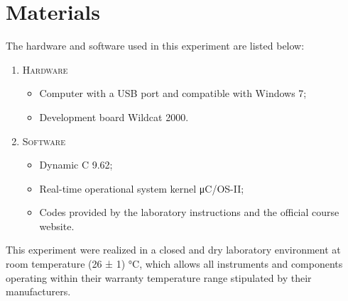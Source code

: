 \section{Materials}

The hardware and software used in this experiment are listed below:

\begin{enumerate}[]
\item \textsc{Hardware}
\begin{itemize}[label={--}]
\item Computer with a USB port and compatible with Windows 7;
\item Development board Wildcat 2000.
\end{itemize}

\item \textsc{Software}
\begin{itemize}[label={--}]
\item Dynamic C 9.62;
\item Real-time operational system kernel μC/OS-II;
\item Codes provided by the laboratory instructions and the official course website.
\end{itemize}
\end{enumerate}

This experiment were realized in a closed and dry laboratory environment at room temperature (26 ± 1) °C, which allows all instruments and components operating within their warranty temperature range stipulated by their manufacturers.
